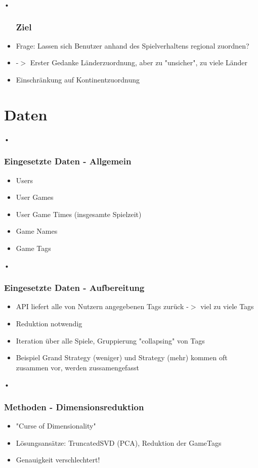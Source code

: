 \documentclass[12pt]{beamer}
\begin{document}
\begin{frame}{•}
\begin{itemize}
\frametitle{Ziel}
\item Frage: Lassen sich Benutzer anhand des Spielverhaltens regional zuordnen?
\item -$>$ Erster Gedanke Länderzuordnung, aber zu "unsicher", zu viele Länder
\item Einschränkung auf Kontinentzuordnung
\end{itemize}
\end{frame}

\section{Daten}
\begin{frame}{•}
\frametitle{Eingesetzte Daten - Allgemein}
\begin{itemize}
\item Users
\item User Games
\item User Game Times (insgesamte Spielzeit)
\item Game Names
\item Game Tags
\end{itemize}
\end{frame}

\begin{frame}{•}
\frametitle{Eingesetzte Daten - Aufbereitung}
\begin{itemize}
\item API liefert alle von Nutzern angegebenen Tags zurück -$>$ viel zu viele Tags
\item Reduktion notwendig
\item Iteration über alle Spiele, Gruppierung "collapsing" von Tags
\item Beispiel Grand Strategy (weniger) und Strategy (mehr) kommen oft zusammen vor, werden zussamengefasst
\end{itemize}

\end{frame}


\begin{frame}{•}
\frametitle{Methoden - Dimensionsreduktion}
\begin{itemize}
\item "Curse of Dimensionality"
\item Lösungsansätze: TruncatedSVD (PCA), Reduktion der GameTags
\item Genauigkeit verschlechtert!
\end{itemize}
\end{frame}
\end{document}
